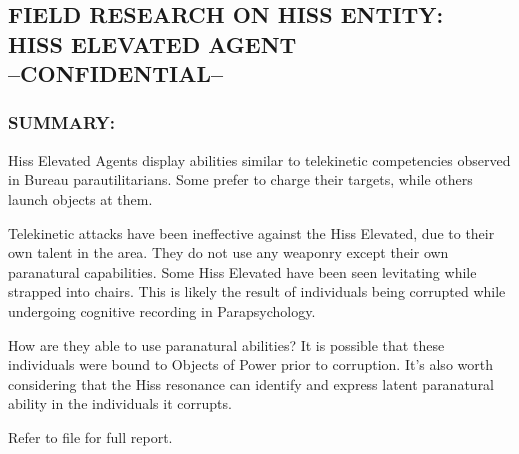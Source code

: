 \subsection*{FIELD RESEARCH ON HISS ENTITY:\\
	HISS ELEVATED AGENT\\
	--CONFIDENTIAL--}
\subsubsection*{SUMMARY:}
\par Hiss Elevated Agents display abilities
similar to telekinetic competencies
observed in Bureau parautilitarians.
Some prefer to charge their targets,
while others launch objects at them.
\par Telekinetic attacks have been ineffective
against the Hiss Elevated, due to their own talent in the area.
They do not use any weaponry except their own paranatural
capabilities. Some Hiss Elevated have been seen levitating while
strapped into chairs. This is likely the result of individuals being
corrupted while undergoing cognitive recording in
Parapsychology.
\par How are they able to use paranatural abilities? It is possible that
these individuals were bound to Objects of Power prior to
corruption. It's also worth considering that the Hiss resonance
can identify and express latent paranatural ability in the individuals
it corrupts.
\par Refer to file  for full report.